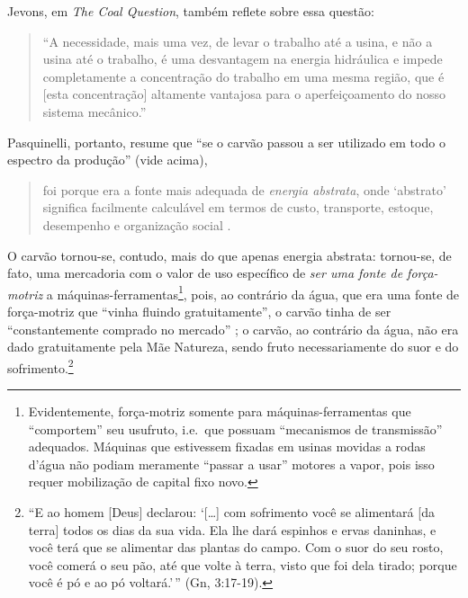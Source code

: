 \documentclass[12pt]{article}
\numberwithin{equation}{section}
\theoremstyle{plain}
\theoremstyle{definition}
\theoremstyle{remark}
\begin{document}
Jevons, em \emph{The Coal Question}, também reflete sobre essa questão:

\begin{quote}
``A necessidade, mais uma vez, de levar o trabalho até a usina, e não a usina até o trabalho, é uma desvantagem na energia hidráulica e impede completamente a concentração do trabalho em uma mesma região, que é {[}esta concentração{]} altamente vantajosa para o aperfeiçoamento do nosso sistema mecânico.'' \parencite[p. 89]{Jevons1866}
\end{quote}

Pasquinelli, portanto, resume que ``se o carvão passou a ser utilizado em todo o espectro da produção'' (vide acima),

\begin{quote}
foi porque era a fonte mais adequada de \emph{energia abstrata}, onde `abstrato' significa facilmente calculável em termos de custo, transporte, estoque, desempenho e organização social \parencite[p. 122-3, grifo no original]{Pasquinelli2023}.
\end{quote}

O carvão tornou-se, contudo, mais do que apenas energia abstrata: tornou-se, de fato, uma mercadoria com o valor de uso específico de \emph{ser uma fonte de força-motriz} a máquinas-ferramentas\footnote{Evidentemente, força-motriz somente para máquinas-ferramentas que ``comportem'' seu usufruto, i.e.~que possuam ``mecanismos de transmissão'' adequados. Máquinas que estivessem fixadas em usinas movidas a rodas d'água não podiam meramente ``passar a usar'' motores a vapor, pois isso requer mobilização de capital fixo novo.}, pois, ao contrário da água, que era uma fonte de força-motriz que ``vinha fluindo gratuitamente'', o carvão tinha de ser ``constantemente comprado no mercado'' \parencite[p. 29]{Malm2013}; o carvão, ao contrário da água, não era dado gratuitamente pela Mãe Natureza, sendo fruto necessariamente do suor e do sofrimento.\footnote{``E ao homem {[}Deus{]} declarou: `{[}\ldots{]} com sofrimento você se alimentará {[}da terra{]} todos os dias da sua vida. Ela lhe dará espinhos e ervas daninhas, e você terá que se alimentar das plantas do campo. Com o suor do seu rosto, você comerá o seu pão, até que volte à terra, visto que foi dela tirado; porque você é pó e ao pó voltará.'\,'' (Gn, 3:17-19).}
\end{document}

